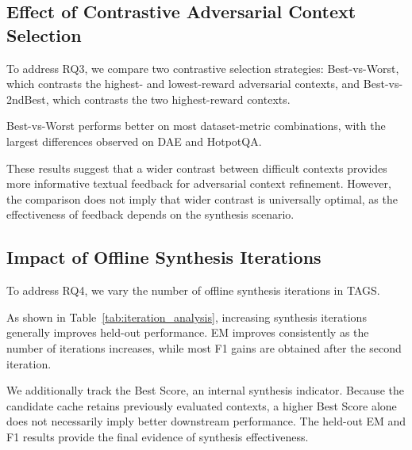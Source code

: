 \documentclass[11pt]{article}
\begin{document}
\subsection{Effect of Contrastive Adversarial Context Selection}
\label{subsec:contrastive_effect}
To address RQ3, we compare two contrastive selection strategies:
Best-vs-Worst, which contrasts the highest- and lowest-reward adversarial contexts, and Best-vs-2ndBest, which contrasts the two highest-reward contexts.

Best-vs-Worst performs better on most dataset-metric combinations, with the largest differences observed on DAE and HotpotQA.

These results suggest that a wider contrast between difficult contexts provides more informative textual feedback for adversarial context refinement.
However, the comparison does not imply that wider contrast is universally optimal, as the effectiveness of feedback depends on the synthesis scenario.

\subsection{Impact of Offline Synthesis Iterations}
\label{subsec:iteration_effect}



To address RQ4, we vary the number of offline synthesis iterations in TAGS.

As shown in Table~\ref{tab:iteration_analysis}, increasing synthesis iterations generally improves held-out performance. 
EM improves consistently as the number of iterations increases, while most F1 gains are obtained after the second iteration.

We additionally track the Best Score, an internal synthesis indicator. 
Because the candidate cache retains previously evaluated contexts, a higher Best Score alone does not necessarily imply better downstream performance. 
The held-out EM and F1 results provide the final evidence of synthesis effectiveness.
\end{document}
